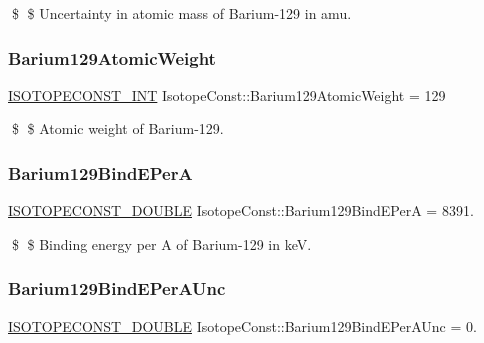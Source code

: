 \$ \$ Uncertainty in atomic mass of Barium-\/129 in amu. \mbox{\label{group___isotope_const-_barium-_ba129_ga7953daae185bb6171a01a2b7df9f637d}} 
\subsubsection{\texorpdfstring{Barium129\+Atomic\+Weight}{Barium129AtomicWeight}}
{\footnotesize\ttfamily \mbox{\hyperlink{group___isotope_const-_macros_ga5f18360b3e99483a35c32d789e62621c}{I\+S\+O\+T\+O\+P\+E\+C\+O\+N\+S\+T\+\_\+\+I\+NT}} Isotope\+Const\+::\+Barium129\+Atomic\+Weight = 129}

\$ \$ Atomic weight of Barium-\/129. \mbox{\label{group___isotope_const-_barium-_ba129_ga4fe498ec26d95554c19fa6c2c8263e50}} 
\subsubsection{\texorpdfstring{Barium129\+Bind\+E\+PerA}{Barium129BindEPerA}}
{\footnotesize\ttfamily \mbox{\hyperlink{group___isotope_const-_macros_ga8f45a7272ce02c0b4c65c44636ed719a}{I\+S\+O\+T\+O\+P\+E\+C\+O\+N\+S\+T\+\_\+\+D\+O\+U\+B\+LE}} Isotope\+Const\+::\+Barium129\+Bind\+E\+PerA = 8391.}

\$ \$ Binding energy per A of Barium-\/129 in keV. \mbox{\label{group___isotope_const-_barium-_ba129_ga320ff5d7889c2c7f4e42cbc6e57c83b8}} 
\subsubsection{\texorpdfstring{Barium129\+Bind\+E\+Per\+A\+Unc}{Barium129BindEPerAUnc}}
{\footnotesize\ttfamily \mbox{\hyperlink{group___isotope_const-_macros_ga8f45a7272ce02c0b4c65c44636ed719a}{I\+S\+O\+T\+O\+P\+E\+C\+O\+N\+S\+T\+\_\+\+D\+O\+U\+B\+LE}} Isotope\+Const\+::\+Barium129\+Bind\+E\+Per\+A\+Unc = 0.}

